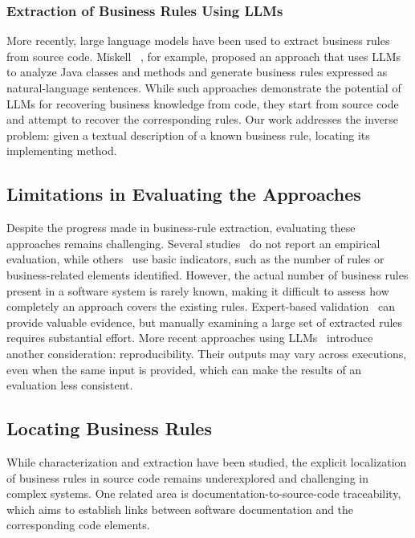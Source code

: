\subsubsection{Extraction of Business Rules Using LLMs}\noindent

More recently, large language models have been used to extract business rules from source code. Miskell \etal~\cite{Misk23a}, for example, proposed an approach that uses LLMs to analyze Java classes and methods and generate business rules expressed as natural-language sentences. While such approaches demonstrate the potential of LLMs for recovering business knowledge from code, they start from source code and attempt to recover the corresponding rules. Our work addresses the inverse problem: given a textual description of a known business rule, locating its implementing method.

\subsection{Limitations in Evaluating the Approaches}
\label{sec:limitations}

Despite the progress made in business-rule extraction, evaluating these approaches remains challenging. Several studies~\cite{Chia06a,Snee96a} do not report an empirical evaluation, while others~\cite{Wang04b,Wang04a,Snee20b,Chap12a} use basic indicators, such as the number of rules or business-related elements identified. However, the actual number of business rules present in a software system is rarely known, making it difficult to assess how completely an approach covers the existing rules. Expert-based validation~\cite{Gang09a} can provide valuable evidence, but manually examining a large set of extracted rules requires substantial effort. More recent approaches using LLMs~\cite{Misk23a} introduce another consideration: reproducibility. Their outputs may vary across executions, even when the same input is provided, which can make the results of an evaluation less consistent.

\subsection{Locating Business Rules}

While characterization and extraction have been studied, the explicit localization of business rules in source code remains underexplored and challenging in complex systems. One related area is documentation-to-source-code traceability, which aims to establish links between software documentation and the corresponding code elements.

